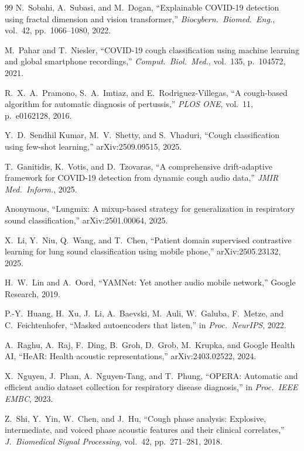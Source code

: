 \documentclass[journal]{IEEEtran}
\begin{document}
\begin{thebibliography}{99}
N.~Sobahi, A.~Subasi, and M.~Dogan,
``Explainable COVID-19 detection using fractal dimension and vision transformer,''
\emph{Biocybern.\ Biomed.\ Eng.}, vol.~42, pp.~1066--1080, 2022.

M.~Pahar and T.~Niesler,
``COVID-19 cough classification using machine learning and global
smartphone recordings,''
\emph{Comput.\ Biol.\ Med.}, vol.~135, p.~104572, 2021.

R.~X.~A.~Pramono, S.~A.~Imtiaz, and E.~Rodriguez-Villegas,
``A cough-based algorithm for automatic diagnosis of pertussis,''
\emph{PLOS ONE}, vol.~11, p.~e0162128, 2016.

Y.~D.~Sendhil Kumar, M.~V.~Shetty, and S.~Vhaduri,
``Cough classification using few-shot learning,''
arXiv:2509.09515, 2025.

T.~Ganitidis, K.~Votis, and D.~Tzovaras,
``A comprehensive drift-adaptive framework for COVID-19 detection from
dynamic cough audio data,''
\emph{JMIR Med.\ Inform.}, 2025.

Anonymous, ``Lungmix: A mixup-based strategy for generalization in
respiratory sound classification,'' arXiv:2501.00064, 2025.

X.~Li, Y.~Niu, Q.~Wang, and T.~Chen,
``Patient domain supervised contrastive learning for lung sound
classification using mobile phone,''
arXiv:2505.23132, 2025.

H.~W.~Lin and A.~Oord,
``YAMNet: Yet another audio mobile network,'' Google Research, 2019.

P.-Y.~Huang, H.~Xu, J.~Li, A.~Baevski, M.~Auli, W.~Galuba,
F.~Metze, and C.~Feichtenhofer,
``Masked autoencoders that listen,'' in \emph{Proc.\ NeurIPS}, 2022.

A.~Raghu, A.~Raj, F.~Ding, B.~Groh, D.~Grob, M.~Krupka,
and Google Health AI,
``HeAR: Health acoustic representations,'' arXiv:2403.02522, 2024.

X.~Nguyen, J.~Phan, A.~Nguyen-Tang, and T.~Phung,
``OPERA: Automatic and efficient audio dataset collection for
respiratory disease diagnosis,''
in \emph{Proc.\ IEEE EMBC}, 2023.

Z.~Shi, Y.~Yin, W.~Chen, and J.~Hu,
``Cough phase analysis: Explosive, intermediate, and voiced
phase acoustic features and their clinical correlates,''
\emph{J.\ Biomedical Signal Processing}, vol.~42, pp.~271--281, 2018.


\end{thebibliography}
\end{document}
